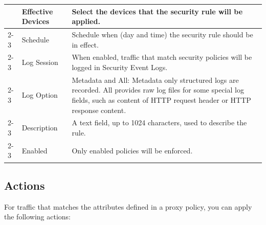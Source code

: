 \begin{longtable}{p{}|p{}|p{}}
                              & Effective Devices & Select the devices that the security rule will be applied.\\ \cline{2-3}
                              & Schedule & Schedule when (day and time) the security rule should be in effect. \\ \cline{2-3}
                              & Log Session & When enabled, traffic that match security policies will be logged in Security Event Logs. \\ \cline{2-3}
                              & Log Option &  Metadata and All: Metadata only structured logs are recorded. All provides raw log files for some special log fields, such as content of HTTP request header or HTTP response content.\\ \cline{2-3}
                              & Description & A text field, up to 1024 characters, used to describe the rule. \\ \cline{2-3}
                              & Enabled & Only enabled policies will be enforced.\\ \hline                                                                                                 
\end{longtable}

\subsection*{\hypertarget{link:Proxy Actions}{Actions}}
\label{sec:policies:proxy:action}

For traffic that matches the attributes defined in a proxy policy, you can apply the following actions: 


